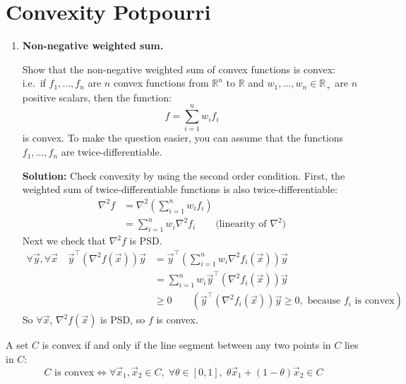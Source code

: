 \documentclass[10pt]{article}
\theoremstyle{definition}
\theoremstyle{plain}
\newcommand{\RR}{\mathbb{R}}
\begin{document}
\section{Convexity Potpourri}

\begin{enumerate}[label=(\alph*)]
    \item \textbf{Non-negative weighted sum.}

    Show that the non-negative weighted sum of convex functions is convex: i.e.\ if $f_1, \ldots, f_n$ are $n$ convex functions from $\RR^n$ to $\RR$ and $w_1, \ldots, w_n \in \RR_+$ are $n$ positive scalars, then the function:
    \begin{equation}
        f = \sum_{i=1}^{n} w_i f_i
    \end{equation}
    is convex. To make the question easier, you can assume that the functions $f_1, \ldots, f_n$ are twice-differentiable.

    \textbf{Solution:} Check convexity by using the second order condition. First, the weighted sum of twice-differentiable functions is also twice-differentiable:
    \begin{align}
        \nabla^2 f &= \nabla^2 \left(\sum_{i=1}^{n} w_i f_i\right) \\
        &= \sum_{i=1}^{n} w_i \nabla^2 f_i \qquad \text{(linearity of } \nabla^2\text{)}
    \end{align}
    Next we check that $\nabla^2 f$ is PSD.
    \begin{align}
        \forall \vec{y}, \forall \vec{x} \quad \vec{y}^\top (\nabla^2 f(\vec{x})) \vec{y} &= \vec{y}^\top \left(\sum_{i=1}^{n} w_i \nabla^2 f_i(\vec{x})\right) \vec{y} \\
        &= \sum_{i=1}^{n} w_i \vec{y}^\top (\nabla^2 f_i(\vec{x})) \vec{y} \\
        &\ge 0 \qquad (\vec{y}^\top (\nabla^2 f_i(\vec{x})) \vec{y} \ge 0, \text{ because } f_i \text{ is convex})
    \end{align}
    So $\forall \vec{x}$, $\nabla^2 f(\vec{x})$ is PSD, so $f$ is convex.
\end{enumerate}

A set $C$ is convex if and only if the line segment between any two points in $C$ lies in $C$:
\begin{equation}
    C \text{ is convex} \iff \forall \vec{x}_1, \vec{x}_2 \in C, \; \forall \theta \in [0,1], \; \theta \vec{x}_1 + (1-\theta)\vec{x}_2 \in C
\end{equation}
\end{document}
